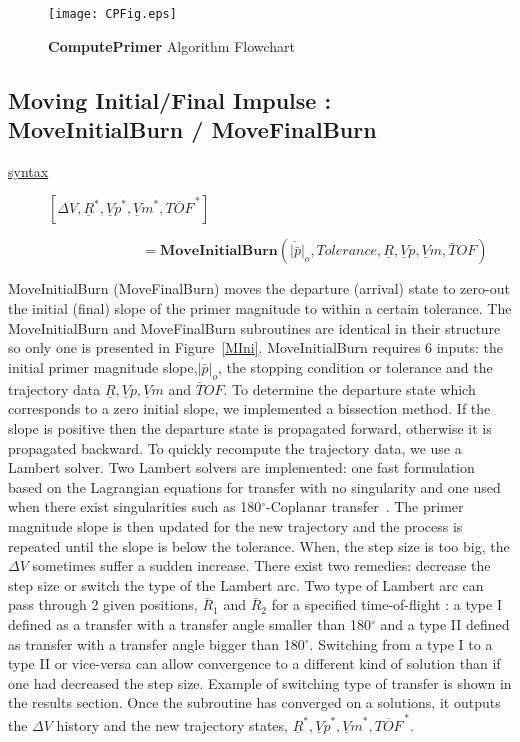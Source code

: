 \documentclass[12pt]{report}
\begin{document}
\begin{figure}
\centering
\texttt{[image: CPFig.eps]}
\caption{\textbf{ComputePrimer} Algorithm Flowchart} \label{CompP}
\end{figure}

\subsection{Moving Initial/Final Impulse : MoveInitialBurn / MoveFinalBurn}
\begin{description}
\item[\underline{syntax}]$[ \Delta V, \underline{R}^{*}, {\underline{V}p}^{*},{\underline{V}m}^{*},{\overline{TOF}}^{\,*}]$
\item[]$\; \; \; \; \; \; \; \; \; \; \; \;\;\;\;\;\;\;\;\;\;\;\;\; = \textbf{MoveInitialBurn}(\dot{|\bar p|}_{o}, Tolerance, \underline{R}, \underline{V}p,\underline{V}m,\bar TOF)$
\end{description}
MoveInitialBurn (MoveFinalBurn) moves the departure (arrival)
state to zero-out the initial (final) slope of the primer
magnitude to within a certain tolerance. The MoveInitialBurn and
MoveFinalBurn subroutines are identical in their structure so only
one is presented in Figure~\ref{MIni}. MoveInitialBurn requires 6
inputs: the initial primer magnitude slope,$\dot{|\bar p|}_{o}$,
the stopping condition or tolerance and the trajectory data
$\underline{R}, \underline{V}p,\underline{V}m$ and $\bar TOF$. To
determine the departure state which corresponds to a zero initial
slope, we implemented a bissection method. If the slope is
positive then the departure state is propagated forward, otherwise
it is propagated backward. To quickly recompute the trajectory
data, we use a Lambert solver. Two Lambert solvers are
implemented: one fast formulation based on the Lagrangian
equations for transfer with no singularity and one used when there
exist singularities such as 180$^{\circ}$-Coplanar
transfer~\cite{Bat84}. The primer magnitude slope is then updated
for the new trajectory and the process is repeated until the slope
is below the tolerance. When, the step size is too big, the
$\Delta V$ sometimes suffer a sudden increase. There exist two
remedies: decrease the step size or switch the type of the Lambert
arc. Two type of Lambert arc can pass through 2 given positions,
$\bar R_{1}$ and $\bar R_{2}$ for a specified time-of-flight : a
type I defined as a transfer with a transfer angle smaller than
180$^{\circ}$ and a type II defined as transfer with a transfer
angle bigger than 180$^{\circ}$. Switching from a type I to a type
II or vice-versa can allow convergence to a different kind of
solution than if one had decreased the step size. Example of
switching type of transfer is shown in the results section. Once
the subroutine has converged on a solutions, it outputs the
$\Delta V$ history and the new trajectory states,
$\underline{R}^{*}, {\underline{V}p}^{*}, {\underline{V}m}^{*},
{\overline{TOF}}^{\,*}$.\\
\\
\\
\end{document}
